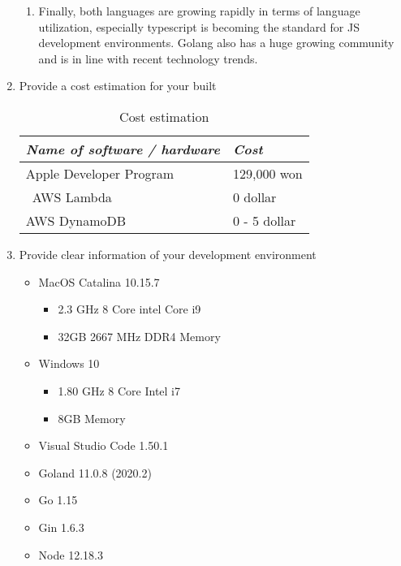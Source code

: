 \documentclass[conference]{IEEEtran}
\begin{document}
\begin{enumerate}
\begin{enumerate}
        \item Finally, both languages are growing rapidly in terms of language utilization, especially typescript is becoming the standard for JS development environments. Golang also has a huge growing community and is in line with recent technology trends.\\
    \end{enumerate}
    \item Provide a cost estimation for your built \\
    
    \begin{table}[h!]
    \caption{Cost estimation}
    \begin{center}
    \begin{tabular}{ | m{6cm} | m{2cm} | }
    \hline
    \textbf{\textit{Name of software / hardware}}& \textbf{\textit{Cost}} \\
    \hline
    Apple Developer Program & 129,000 won \\
    \hline\
    AWS Lambda & 0 dollar \\
    \hline
    AWS DynamoDB & 0 - 5 dollar \\
    \hline
    \end{tabular}
    \label{tab1}
    \end{center}
    \end{table}
    \item Provide clear information of your development environment
    \begin{itemize}
        \item MacOS Catalina 10.15.7
        \begin{itemize}
            \item 2.3 GHz 8 Core intel Core i9 
            \item 32GB 2667 MHz DDR4 Memory 
        \end{itemize}
        \item Windows 10
        \begin{itemize}
            \item 1.80 GHz 8 Core Intel i7
            \item 8GB Memory
        \end{itemize}
        \item Visual Studio Code 1.50.1
        \item Goland 11.0.8 (2020.2)
        \item Go 1.15
        \item Gin 1.6.3
        \item Node 12.18.3

\end{itemize}
\end{enumerate}
\end{document}
